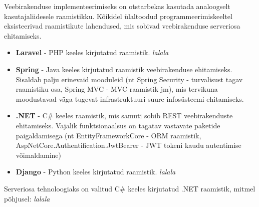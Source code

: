 Veebirakenduse implementeerimiseks on otstarbekas kasutada analoogselt kasutajaliidesele raamistikku. Kõikidel ülaltoodud programmeerimiskeeltel 
eksisteerivad raamistikute lahendused, mis sobivad veebirakenduse serveriosa ehitamiseks.



\begin{itemize}
    \item \textbf{Laravel} - PHP keeles kirjutatud raamistik. \textit{lalala}
    \item \textbf{Spring} - Java keeles kirjutatud raamistik veebirakenduse ehitamiseks. Sisaldab palju erinevaid mooduleid 
(nt Spring Security - turvalisust tagav raamistiku osa, Spring MVC - MVC raamistik jm), mis tervikuna moodustavad 
väga tugevat infrastruktuuri suure infosüsteemi ehitamiseks.
    \item \textbf{.NET} - C\# keeles raamistik, mis samuti sobib REST veebirakenduste ehitamiseks. 
Vajalik funktsionaalsus on tagatav vastavate paketide paigaldamisega (nt EntityFrameworkCore - 
ORM raamistik, AspNetCore.Authentification.JwtBearer - JWT tokeni kaudu autentimise võimaldamine)
    \item \textbf{Django} - Python keeles kirjutatud raamistik. \textit{lalala}
\end{itemize}

Serveriosa tehnoloogiaks on valitud C\# keeles kirjutatud .NET raamistik, mitmel põhjusel: \textit{lalala}